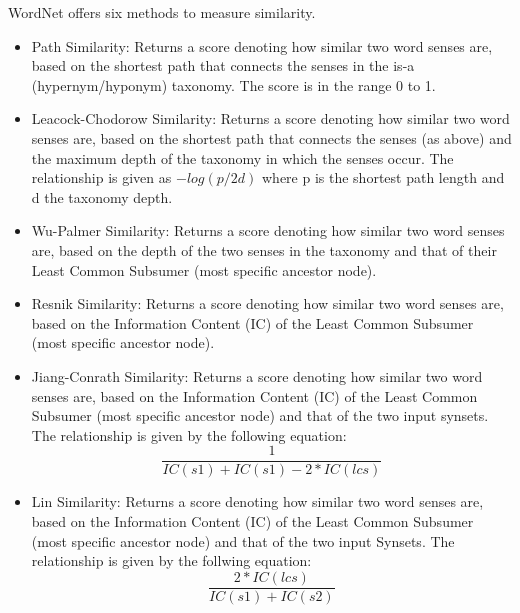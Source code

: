 \documentclass{article}
\begin{document}
WordNet offers six methods to measure similarity.\cite{pedersen2004wordnet}
\begin{itemize}
	\item Path Similarity: Returns a score denoting how similar two word senses are, based on the shortest path that connects the senses in the is-a (hypernym/hyponym) taxonomy. The score is in the range 0 to 1. %
	\item Leacock-Chodorow Similarity: Returns a score denoting how similar two word senses are, based on the shortest path that connects the senses (as above) and the maximum depth of the taxonomy in which the senses occur. The relationship is given as \(-log(p/2d)\) where p is the shortest path length and d the taxonomy depth. %
	\item Wu-Palmer Similarity: Returns a score denoting how similar two word senses are, based on the depth of the two senses in the taxonomy and that of their Least Common Subsumer (most specific ancestor node). %
	\item Resnik Similarity: Returns a score denoting how similar two word senses are, based on the Information Content (IC) of the Least Common Subsumer (most specific ancestor node). %
	\item Jiang-Conrath Similarity: Returns a score denoting how similar two word senses are, based on the Information Content (IC) of the Least Common Subsumer (most specific ancestor node) and that of the two input synsets. The relationship is given by the following equation:
\begin{equation} \label{eq:jcnsimilarity}
	\frac{1} {IC(s1) + IC(s1) - 2 * IC(lcs)}
\end{equation}
	\item Lin Similarity: Returns a score denoting how similar two word senses are, based on the Information Content (IC) of the Least Common Subsumer (most specific ancestor node) and that of the two input Synsets. The relationship is given by the follwing equation:
\begin{equation} \label{eq:linsimilarity}
	\frac{2 * IC(lcs)} {IC(s1) + IC(s2)} 
\end{equation} 
\end{itemize}
\end{document}
